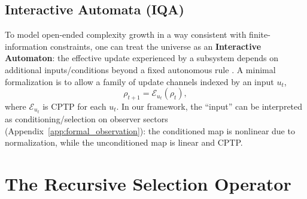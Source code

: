 \subsection{Interactive Automata (IQA)}
To model open-ended complexity growth in a way consistent with finite-information constraints, one can treat the universe as an \textbf{Interactive Automaton}: the effective update experienced by a subsystem depends on additional inputs/conditions beyond a fixed autonomous rule \cite{wegner1997interaction}. A minimal formalization is to allow a family of update channels indexed by an input $u_t$,
\begin{equation}
    \rho_{t+1} = \mathcal{E}_{u_t}(\rho_t),
\end{equation}
where $\mathcal{E}_{u_t}$ is CPTP for each $u_t$. In our framework, the ``input'' can be interpreted as conditioning/selection on observer sectors (Appendix~\ref{app:formal_observation}): the conditioned map is nonlinear due to normalization, while the unconditioned map is linear and CPTP.

\section{The Recursive Selection Operator}
\label{chap:selection_operator}

